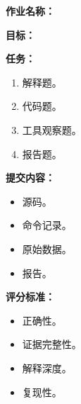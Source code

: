 \begin{exercisebox}
\textbf{作业名称：}

\textbf{目标：}

\textbf{任务：}

\begin{enumerate}
  \item 解释题。
  \item 代码题。
  \item 工具观察题。
  \item 报告题。
\end{enumerate}

\textbf{提交内容：}

\begin{itemize}
  \item 源码。
  \item 命令记录。
  \item 原始数据。
  \item 报告。
\end{itemize}

\textbf{评分标准：}

\begin{itemize}
  \item 正确性。
  \item 证据完整性。
  \item 解释深度。
  \item 复现性。
\end{itemize}
\end{exercisebox}
